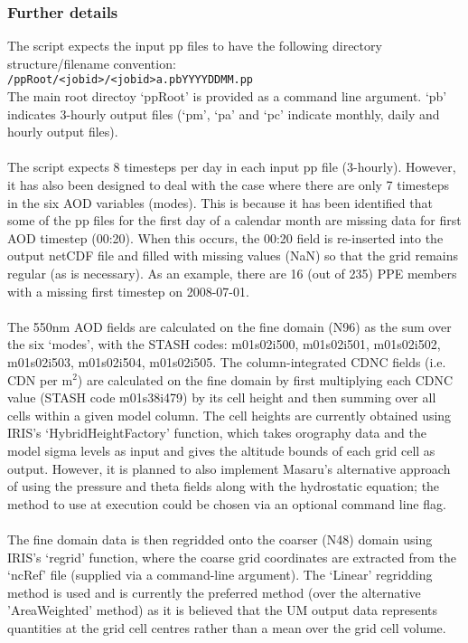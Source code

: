 \documentclass[10pt,a4paper]{article}
\newcommand\tab[1][0.5cm]{\hspace*{#1}}
\begin{document}
\subsubsection{Further details}
The script expects the input pp files to have the following directory structure/filename convention:\\
\tab \texttt{/ppRoot/<jobid>/<jobid>a.pbYYYYDDMM.pp}\\
The main root directoy `ppRoot' is provided as a command line argument. `pb' indicates 3-hourly output files (`pm', `pa' and `pc' indicate monthly, daily and hourly output files).\\\\
The script expects 8 timesteps per day in each input pp file (3-hourly). However, it has also been designed to deal with the case where there are only 7 timesteps in the six AOD variables (modes). This is because it has been identified that some of the pp files for the first day of a calendar month are missing data for first AOD timestep (00:20). When this occurs, the 00:20 field is re-inserted into the output netCDF file and filled with missing values (NaN) so that the grid remains regular (as is necessary). As an example, there are 16 (out of 235) PPE members with a missing first timestep on 2008-07-01.\\\\
The 550nm AOD fields are calculated on the fine domain (N96) as the sum over the six `modes', with the STASH codes: m01s02i500, m01s02i501, m01s02i502, m01s02i503, m01s02i504, m01s02i505. The column-integrated CDNC fields (i.e. CDN per m$^2$) are calculated on the fine domain by first multiplying each CDNC value (STASH code m01s38i479) by its cell height and then summing over all cells within a given model column. The cell heights are currently obtained using IRIS's `HybridHeightFactory' function, which takes orography data and the model sigma levels as input and gives the altitude bounds of each grid cell as output. However, it is planned to also implement Masaru's alternative approach of using the pressure and theta fields along with the hydrostatic equation; the method to use at execution could be chosen via an optional command line flag.\\\\
The fine domain data is then regridded onto the coarser (N48) domain using IRIS's `regrid' function, where the coarse grid coordinates are extracted from the `ncRef' file (supplied via a command-line argument). The `Linear' regridding method is used and is currently the preferred method (over the alternative 'AreaWeighted' method) as it is believed that the UM output data represents quantities at the grid cell centres rather than a mean over the grid cell volume.\\\\
\end{document}
